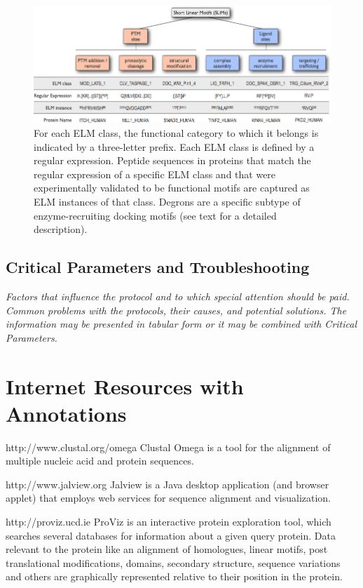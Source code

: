 \documentclass[12pt]{article}
\newcounter{proto}
\begin{document}
\begin{figure}[h!]
\centering
\includegraphics[width=\textwidth]{Figures/Introduction/functional_classification_of_SLiMs.png}
\caption{
For each ELM class, the
functional category to which it belongs is indicated by a three-letter prefix.
Each ELM class is defined by a regular expression. Peptide sequences in
proteins that match the regular expression of a specific ELM class and that
were experimentally validated to be functional motifs are captured as ELM
instances of that class. Degrons are a specific subtype of enzyme-recruiting
docking motifs (see text for a detailed description).
}
\label{fig:SLiMclasses}
\end{figure}

\subsection*{Critical Parameters and Troubleshooting}\label{critical-parameters-and-troubleshooting}

\emph{Factors that influence the protocol and to which special attention should be paid.
Common problems with the protocols, their causes, and potential solutions. The information may be presented in tabular form or it may be combined with Critical Parameters.
}

\section*{Internet Resources with Annotations}%
\label{internet-resources-with-annotations}

http://www.clustal.org/omega Clustal Omega \citep{21988835} is a tool
for the alignment of multiple nucleic acid and protein sequences.

http://www.jalview.org Jalview \citep{19151095} is a Java desktop
application (and browser applet) that employs web services for sequence
alignment and visualization.

http://proviz.ucd.ie ProViz \citep{27085803} is an interactive protein
exploration tool, which searches several databases for information about
a given query protein. Data relevant to the protein like an alignment of
homologues, linear motifs, post translational modifications, domains,
secondary structure, sequence variations and others are graphically
represented relative to their position in the protein.



\end{document}
